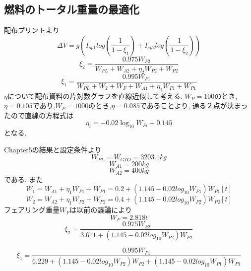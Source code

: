 \subsection{燃料のトータル重量の最適化}
配布プリントより
\begin{equation}
  \Delta V = g(I_{sp1}log(\frac{1}{1-\xi_1}) + I_{sp2}log(\frac{1}{1-\xi_2}))
\end{equation}
\begin{equation}
 \xi_2 = \frac{0.975W_{P2}}{W_{PL} + W_{A2} + \eta_2 W_{P2} + W_{P2}}
\end{equation}
\begin{equation}
\xi_1 = \frac{0.995W_{P1}}{W_{PL} +W_2 + W_F + W_{A1} + \eta_1 W_{P1} + W_{P1}}
\end{equation}
$\eta$について配布資料の片対数グラフを直線近似して考える.
$W_P=100$のとき,$\eta = 0.105$であり,$W_P=1000$のとき,$\eta = 0.085$であることより,
通る２点が決まったので直線の方程式は
\begin{equation}
  \eta_i = -0.02 \log_{10} W_{Pi} + 0.145
\end{equation}
となる.

Chapter5の結果と設定条件より
\begin{equation}
  W_{PL} = W_{GTO} = 3203.1kg
\end{equation}
\begin{equation}
  W_{A1} = 200kg
\end{equation}
\begin{equation}
  W_{A2} = 400kg
\end{equation}
である.
また
\begin{equation}
  W_{1} = W_{A1} + \eta_1 W_{P1} + W_{P1} = 0.2 + (1.145 - 0.02 log_{10} W_{P1})W_{P1} [t]
\end{equation}
\begin{equation}
  W_{2} = W_{A2} + \eta_1 W_{P2} + W_{P2} = 0.4 + (1.145 - 0.02 log_{10} W_{P2})W_{P2} [t]
\end{equation}
フェアリング重量$W_F$は以前の議論により
\begin{equation}
  W_F = 2.818t
\end{equation}
\begin{equation}
 \xi_2 = \frac{0.975W_{P2}}{3.611 + (1.145 - 0.02 log_{10} W_{P2})W_{P2}}
\end{equation}

\begin{equation}
\xi_1 = \frac{0.995W_{P1}}{6.229 +(1.145 - 0.02 log_{10} W_{P2})W_{P2} + (1.145 - 0.02 log_{10} W_{P1})W_{P1}}
\end{equation}

